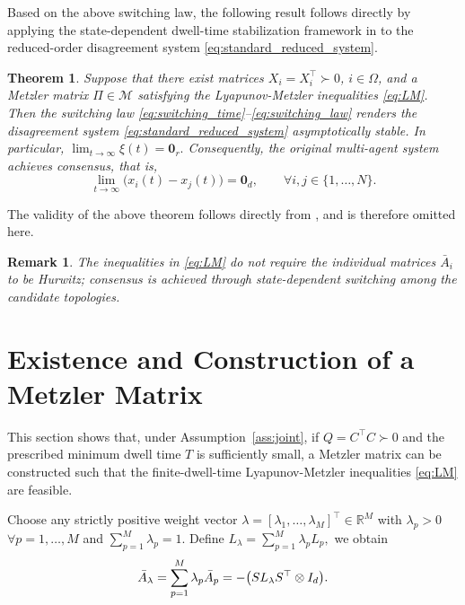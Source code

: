 \documentclass[conference]{IEEEtran}
\newtheorem{theorem}{Theorem}
\newtheorem{remark}{Remark}
\begin{document}
	Based on the above switching law, the following result follows directly by applying the
	state-dependent dwell-time stabilization framework in
	\cite{russo2025} to the reduced-order disagreement system
	\eqref{eq:standard_reduced_system}.
	
	\begin{theorem}\label{thm:switching}
		Suppose that there exist matrices
		$X_i=X_i^\top\succ0$, $i\in\Omega$, and a Metzler matrix
		$\Pi\in\mathcal{M}$ satisfying the Lyapunov-Metzler
		inequalities \eqref{eq:LM}. Then the switching law
		\eqref{eq:switching_time}--\eqref{eq:switching_law} renders
		the disagreement system \eqref{eq:standard_reduced_system}
		asymptotically stable. In particular,
		$
		\lim_{t\to\infty}\xi(t)=\mathbf 0_r.
		$
		Consequently, the original multi-agent system achieves consensus, that is,
		\[
		\lim_{t\to\infty}
		\bigl(x_i(t)-x_j(t)\bigr)
		=
		\mathbf 0_d,
		\qquad
		\forall i,j\in\{1,\ldots,N\}.
		\]
	\end{theorem}
	
	The validity of the above theorem follows directly from \cite[Theorem~1]{russo2025}, and is therefore omitted here.
	
	\begin{remark}
		The inequalities in \eqref{eq:LM} do not require the individual
		matrices $\bar A_i$ to be Hurwitz; consensus is achieved through
		state-dependent switching among the candidate topologies.
	\end{remark}
	
	\section{Existence and Construction of a Metzler Matrix}
	\label{sec:metzler_existence}
	
	This section shows that, under Assumption~\ref{ass:joint},
	if
	$
	Q=C^\top C\succ0
	$
	and the prescribed minimum dwell time $T$ is sufficiently small, a Metzler matrix can be constructed such that the finite-dwell-time Lyapunov-Metzler inequalities \eqref{eq:LM} are feasible.
	
	Choose any strictly positive weight vector
	$
	\lambda
	=
	[\lambda_1,\ldots,\lambda_M]^\top
	\in\mathbb R^M
	$
	with
	$
	\lambda_p>0
	$
	$\forall p=1,\ldots,M$ and
	$
	\sum_{p=1}^{M}\lambda_p=1.
	$
	Define
	$
	L_\lambda
	=
	\sum_{p=1}^{M}\lambda_pL_p,
	$ we obtain
	\vspace{-0.2\baselineskip}
	\[
	\bar A_\lambda
	=
	\sum_{p=1}^{M}\lambda_p\bar A_p
	=
	-\bigl(SL_\lambda S^\top\otimes I_d\bigr).
	\vspace{-0.2\baselineskip}
	\]
	
\end{document}
